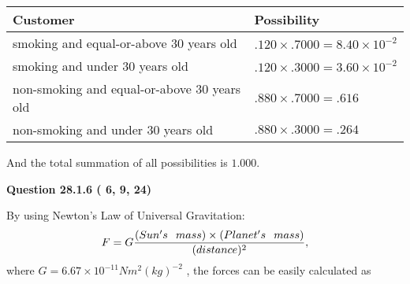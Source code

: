 \documentclass[12pt]{article}
\begin{document}
\noindent
\begin{tabular}{|l|l|}
\hline
Customer & Possibility \\
\hline
smoking  and  %
equal-or-above 30 years old  &
  $ %
.120 \times  %
.7000 =  %
8.40 \times 10^{-2}$ \\
\hline
smoking  and  %
under 30 years old &
  $ %
.120 \times  %
.3000 =  %
3.60 \times 10^{-2}$ \\
\hline
 non-smoking and  %
equal-or-above 30 years old  &
  $ %
.880 \times  %
.7000 =  %
.616$ \\
\hline
 non-smoking and  %
under 30 years old &
  $ %
.880 \times  %
.3000 =  %
.264$ \\
\hline
\end{tabular}
 
\noindent
And the total summation of all possibilities is $  %
1.000 $.
 
 
 
 
  
\vspace{0.2in}
  
{\textbf{\Large{Question
28.1.6 
 (          6,          9,         24)
}}}
  
  
 
 

By using Newton's Law of Universal Gravitation:
\[
F=G \frac{(Sun's \hspace{0.1in} mass) \times (Planet's \hspace{0.1in} mass)} { (distance)^2},
\]
where
$ G= %
6.67 \times 10^{-11}N m^{2}(kg)^{-2}$ , the forces can be easily calculated as
 
\vspace{0.2in}
 
\end{document}
